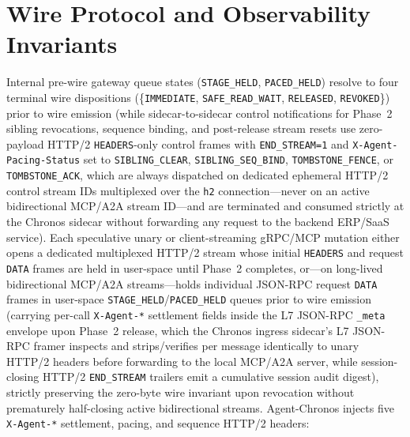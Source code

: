 \documentclass[conference,10pt]{IEEEtran}
\begin{document}
\section{Wire Protocol and Observability Invariants}
\label{sec:wire_protocol}
Internal pre-wire gateway queue states (\texttt{STAGE\_HELD}, \texttt{PACED\_HELD}) resolve to four terminal wire dispositions (\{\texttt{IMMEDIATE}, \texttt{SAFE\_READ\_WAIT}, \texttt{RELEASED}, \texttt{REVOKED}\}) prior to wire emission (while sidecar-to-sidecar control notifications for Phase~2 sibling revocations, sequence binding, and post-release stream resets use zero-payload HTTP/2 \texttt{HEADERS}-only control frames with \texttt{END\_STREAM=1} and \texttt{X-Agent-Pacing-Status} set to \texttt{SIBLING\_CLEAR}, \texttt{SIBLING\_SEQ\_BIND}, \texttt{TOMBSTONE\_FENCE}, or \texttt{TOMBSTONE\_ACK}, which are always dispatched on dedicated ephemeral HTTP/2 control stream IDs multiplexed over the \texttt{h2} connection---never on an active bidirectional MCP/A2A stream ID---and are terminated and consumed strictly at the Chronos sidecar without forwarding any request to the backend ERP/SaaS service). Each speculative unary or client-streaming gRPC/MCP mutation either opens a dedicated multiplexed HTTP/2 stream whose initial \texttt{HEADERS} and request \texttt{DATA} frames are held in user-space until Phase~2 completes, or---on long-lived bidirectional MCP/A2A streams---holds individual JSON-RPC request \texttt{DATA} frames in user-space \texttt{STAGE\_HELD}/\texttt{PACED\_HELD} queues prior to wire emission (carrying per-call \texttt{X-Agent-*} settlement fields inside the L7 JSON-RPC \texttt{\_meta} envelope upon Phase~2 release, which the Chronos ingress sidecar's L7 JSON-RPC framer inspects and strips/verifies per message identically to unary HTTP/2 headers before forwarding to the local MCP/A2A server, while session-closing HTTP/2 \texttt{END\_STREAM} trailers emit a cumulative session audit digest), strictly preserving the zero-byte wire invariant upon revocation without prematurely half-closing active bidirectional streams. Agent-Chronos injects five \texttt{X-Agent-*} settlement, pacing, and sequence HTTP/2 headers:
\end{document}
